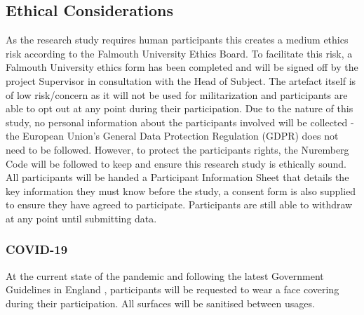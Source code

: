\subsection{Ethical Considerations}
As the research study requires human participants this creates a medium ethics risk according to the Falmouth University Ethics Board. To facilitate this risk, a Falmouth University ethics form has been completed and will be signed off by the project Supervisor in consultation with the Head of Subject. The artefact itself is of low risk/concern as it will not be used for militarization and participants are able to opt out at any point during their participation.
Due to the nature of this study, no personal information about the participants involved will be collected - the European Union's General Data Protection Regulation (GDPR)\cite{gdpr} does not need to be followed. However, to protect the participants rights, the Nuremberg Code will be followed to keep and ensure this research study is ethically sound\cite{nuremberg-code}. All participants will be handed a Participant Information Sheet that details the key information they must know before the study, a consent form is also supplied to ensure they have agreed to participate. Participants are still able to withdraw at any point until submitting data.
\subsubsection*{COVID-19}
At the current state of the pandemic and following the latest Government Guidelines in England \cite{gov-guidlines}, participants will be requested to wear a face covering during their participation. All surfaces will be sanitised between usages.